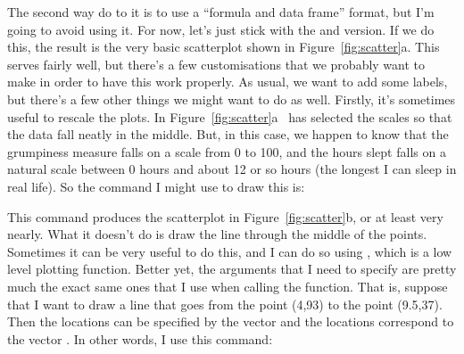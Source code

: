 The second way do to it is to use a ``formula and data frame'' format, but I'm going to avoid using it. For now, let's just stick with the  and  version. If we do this, the result is the very basic scatterplot shown in Figure~\ref{fig:scatter}a. This serves fairly well, but there's a few customisations that we probably want to make in order to have this work properly. As usual, we want to add some labels, but there's a few other things we might want to do as well. Firstly, it's sometimes useful to rescale the plots. In Figure~\ref{fig:scatter}a \R\ has selected the scales so that the data fall neatly in the middle. But, in this case, we happen to know that the grumpiness measure falls on a scale from 0 to 100, and the hours slept falls on a natural scale between 0 hours and about 12 or so hours (the longest I can sleep in real life). So the command I might use to draw this is:
This command produces the scatterplot in Figure~\ref{fig:scatter}b, or at least very nearly. What it doesn't do is draw the line through the middle of the points. Sometimes it can be very useful to do this, and I can do so using , which is a low level plotting function. Better yet, the arguments that I need to specify are pretty much the exact same ones that I use when calling the  function. That is, suppose that I want to draw a line that goes from the point (4,93) to the point (9.5,37). Then the  locations can be specified by the vector  and the  locations correspond to the vector . In other words, I use this command:
